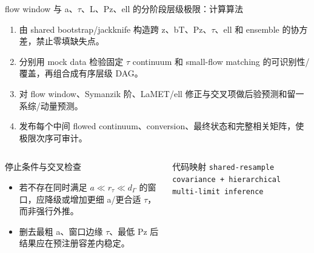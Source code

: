 \begin{frame}[t]{flow window 与 a、\ensuremath{\tau}、L、Pz、ell 的分阶段层级极限：计算算法}
\footnotesize
{}\begin{enumerate}
\item 由 shared bootstrap/\allowbreak{}jackknife 构造跨 z、bT、Pz、\ensuremath{\tau}、ell 和 ensemble 的协方差，禁止零填缺失点。
\item 分别用 mock data 检验固定 \ensuremath{\tau} continuum 和 small-flow matching 的可识别性/\allowbreak{}覆盖，再组合成有序层级 DAG。
\item 对 flow window、Symanzik 阶、LaMET/\allowbreak{}ell 修正与交叉项做后验预测和留一系综/\allowbreak{}动量预测。
\item 发布每个中间 flowed continuum、conversion、最终状态和完整相关矩阵，使极限次序可审计。
\end{enumerate}\begin{columns}[T,onlytextwidth]
\begin{block}{停止条件与交叉检查}\scriptsize\begin{itemize}
\item[\CheckMark] 若不存在同时满足 \ensuremath{a\ll r_\tau\ll d_\Gamma} 的窗口，应降级或增加更细 a/\allowbreak{}更合适 \ensuremath{\tau}，而非强行外推。
\item[\CheckMark] 删去最粗 a、窗口边缘 \ensuremath{\tau}、最低 Pz 后结果应在预注册容差内稳定。
\end{itemize}\end{block}
\begin{block}{代码映射}
\scriptsize \texttt{shared-resample covariance + hierarchical multi-limit inference}
\end{block}\end{columns}\end{frame}

